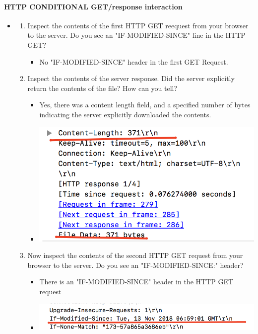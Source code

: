 \documentclass{article}
\begin{document}
  \paragraph{HTTP CONDITIONAL GET/response interaction}
  \begin{itemize}
    \item\begin{enumerate}
      \item Inspect the contents of the first HTTP GET reequest from your browser to the server.  Do you see an "IF-MODIFIED-SINCE" line in the HTTP GET? 
        \begin{itemize}
          \item No "IF-MODIFIED-SINCE" header in the first GET Request. 
        \end{itemize}
      \item Inspect the contents of the server response.  Did the server explicitly return the contents of the file? How can you tell?
      \begin{itemize}
        \item Yes, there was a content length field, and a specified number of bytes indicating the server explicitly downloaded the contents.
        \item \includegraphics[scale=0.5]{images/HTTP9.png}
      \end{itemize}
      \item Now inspect the contents of the second HTTP GET request from your browser to the server.  Do you see an "IF-MODIFIED-SINCE:" header?
        \begin{itemize}
          \item There is an "IF-MODIFIED-SINCE" header in the HTTP GET request
          \item \includegraphics[scale=0.5]{images/HTTP10.png}

\end{itemize}
\end{enumerate}
\end{itemize}
\end{document}
